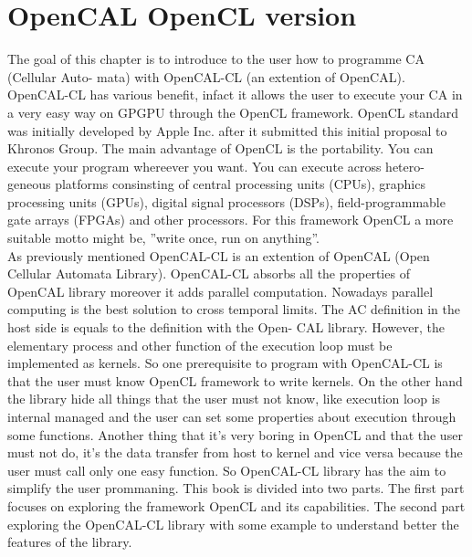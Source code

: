 \chapter{OpenCAL OpenCL version}\label{ch:opencal-cl}

The goal of this chapter is to introduce to the user how to programme CA (Cellular Auto-
mata) with OpenCAL-CL (an extention of OpenCAL). OpenCAL-CL has
various benefit, infact it allows the user to execute your CA in a very easy
way on GPGPU through the OpenCL framework. OpenCL standard was
initially developed by Apple Inc. after it submitted this initial proposal
to Khronos Group. The main advantage of OpenCL is the portability. You can
execute your program whereever you want. You can execute across hetero-
geneous platforms consinsting of central processing units (CPUs), graphics
processing units (GPUs), digital signal processors (DSPs), field-programmable
gate arrays (FPGAs) and other processors. For this framework OpenCL a
more suitable motto might be, ''write once, run on anything''.\\
As previously mentioned OpenCAL-CL is an extention of OpenCAL (Open
Cellular Automata Library). 
OpenCAL-CL absorbs all the properties of
OpenCAL library moreover it adds parallel computation. Nowadays parallel 
computing is the best solution to cross temporal limits.
The AC definition in the host side is equals to the definition with the Open-
CAL library. However, the elementary process and other function of the
execution loop must be implemented as kernels. So one prerequisite to program 
 	with OpenCAL-CL is that the user must know OpenCL framework
to write kernels. On the other hand the library hide all things that the user
must not know, like execution loop is internal managed and the user can
set some properties about execution through some functions. Another thing
that it’s very boring in OpenCL and that the user must not do, it’s the data
transfer from host to kernel and vice versa because the user must call only
one easy function. So OpenCAL-CL library has the aim to simplify the user
prommaning. This book is divided into two parts. The first part focuses on
exploring the framework OpenCL and its capabilities. The second part
exploring the OpenCAL-CL library with some example to understand better the features of the library.

